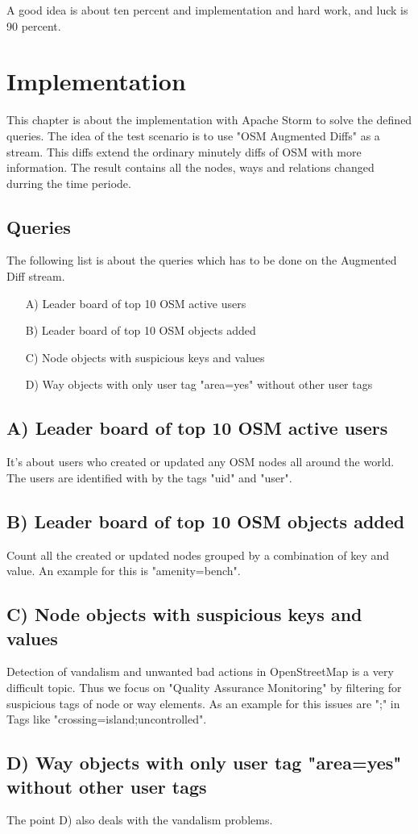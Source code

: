 \begin{savequote}[75mm]
A good idea is about ten percent and implementation and hard work, and luck is 90 percent.
\end{savequote}

\chapter{Implementation}
This chapter is about the implementation with Apache Storm to solve the defined queries.
The idea of the test scenario is to use "OSM Augmented Diffs" as a stream.
This diffs extend the ordinary minutely diffs of OSM with more information.
The result contains all the nodes, ways and relations changed durring the time periode.

\section{Queries}
The following list is about the queries which has to be done on the Augmented Diff stream.

\begin{itemize}
\item[A)] Leader board of top 10 OSM active users
\item[B)] Leader board of top 10 OSM objects added
\item[C)] Node objects with suspicious keys and values
\item[D)] Way objects with only user tag "area=yes" without other user tags
\end{itemize}

\section{A) Leader board of top 10 OSM active users}
It's about users who created or updated any OSM nodes all around the world.
The users are identified with by the tags "uid" and "user".

\section{B) Leader board of top 10 OSM objects added}
Count all the created or updated nodes grouped by a combination of key and value.
An example for this is "amenity=bench".

\section{C) Node objects with suspicious keys and values}
Detection of vandalism and unwanted bad actions in OpenStreetMap is a very difficult topic.
Thus we focus on "Quality Assurance Monitoring" by filtering for suspicious tags of node or way elements.
As an example for this issues are ";" in Tags like "crossing=island;uncontrolled".

\section{D) Way objects with only user tag "area=yes" without other user tags}
The point D) also deals with the vandalism problems.



